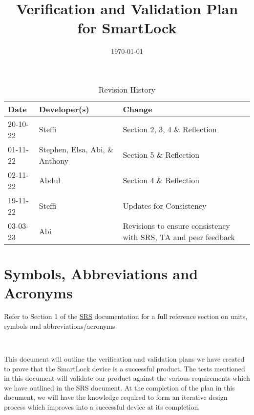 \documentclass[12pt, titlepage]{article}
\title{Verification and Validation Plan for SmartLock\\\progname}
\author{\authname}
\date{\today}
\begin{document}
	


\maketitle


\newpage


\begin{table}[hp]
\caption{Revision History} \label{TblRevisionHistory}
\begin{tabularx}{\textwidth}{llX}
\toprule
\textbf{Date} & \textbf{Developer(s)} & \textbf{Change}\\
\midrule
20-10-22 & Steffi & Section 2, 3, 4 \& Reflection\\
01-11-22 & Stephen, Elsa, Abi, \& Anthony & Section 5 \& Reflection\\
02-11-22 & Abdul & Section 4 \& Reflection\\
19-11-22 & Steffi & Updates for Consistency\\
03-03-23 & Abi & Revisions to ensure consistency with SRS, TA and peer feedback\\
\bottomrule
\end{tabularx}
\end{table}

\newpage

\tableofcontents

\listoftables


\newpage


\section{Symbols, Abbreviations and Acronyms}

Refer to Section 1 of the \href{https://github.com/NevoAbigail/Capstone/blob/main/docs/SRS/SRS.pdf}{SRS} documentation for a full reference section on units, symbols and abbreviations/acronyms.

\-\

This document will outline the verification and validation plans we have created to prove that the SmartLock device is a successful product. The tests mentioned in this document will validate our product against the various requirements which we have outlined in the SRS document. At the completion of the plan in this document, we will have the knowledge required to form an iterative design process which improves into a successful device at its completion. 
\end{document}
